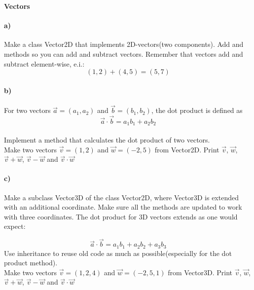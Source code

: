 \begin{Problem}{\textbf{Vectors}} \label{prob93}

\paragraph{a)}

Make a class Vector2D that implements 2D-vectors(two components). Add  and  methods so you can add and subtract vectors. Remember that vectors add and subtract element-wise, e.i.:
\begin{equation*}
    (1,2) + (4,5) = (5,7) 
\end{equation*}

\paragraph{b)}
For two vectors $\Vec{a} = (a_1, a_2)$ and $\Vec{b} = (b_1, b_2)$, the dot product is defined as 
\begin{equation*}
    \Vec{a} \cdot \Vec{b} = a_1 b_1 + a_2 b_2
\end{equation*}
\\
Implement a method  that calculates the dot product of two vectors.
\\
Make two vectors $\Vec{v}=(1,2)$ and $\Vec{w}=(-2,5)$ from Vector2D. Print $\Vec{v}$, $\Vec{w}$, $\Vec{v}+\Vec{w}$, $\Vec{v}-\Vec{w}$ and $\Vec{v}\cdot \Vec{w}$

\paragraph{c)}
Make a subclass Vector3D of the class Vector2D, where Vector3D is extended with an additional coordinate. Make sure all the methods are updated to work with three coordinates. The dot product for 3D vectors extends as one would expect:

\begin{equation*}
    \Vec{a} \cdot \Vec{b} = a_1 b_1 + a_2 b_2 + a_3 b_3
\end{equation*}
Use inheritance to reuse old code as much as possible(especially for the dot product method).
\\
Make two vectors $\Vec{v}=(1,2,4)$ and $\Vec{w}=(-2,5,1)$ from Vector3D. Print $\Vec{v}$, $\Vec{w}$, $\Vec{v}+\Vec{w}$, $\Vec{v}-\Vec{w}$ and $\Vec{v}\cdot \Vec{w}$


\end{Problem}

